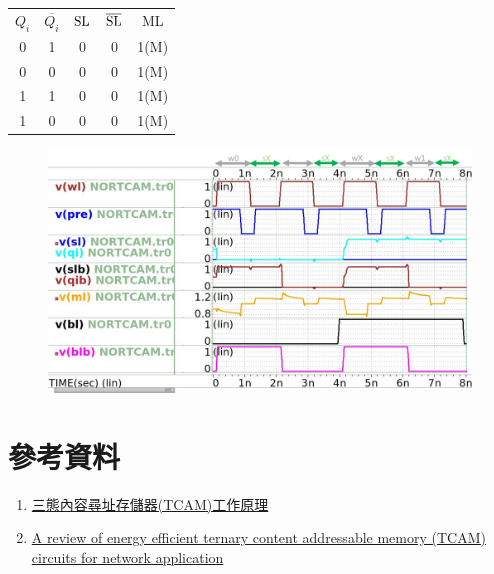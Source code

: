 \documentclass{article}
\begin{document}
\begin{table}[H]
  \centering
  \begin{tabular}{ccccc}
  $Q_i$ & $\overline{Q_i}$& $\rm SL$ & $\rm \overline{SL}$ & ML \\
  0  & 1     & 0  & 0     & 1(M) \\
  0  & 0     & 0  & 0     & 1(M) \\
  1  & 1     & 0  & 0     & 1(M) \\
  1  & 0     & 0  & 0     & 1(M) \\
 
  \end{tabular}
  \end{table}


\begin{figure}[H]
  \centering
  \includegraphics[width=\linewidth]{./img/2023-12-14-07-37-46.png}
  \end{figure}


  \section{參考資料}

  \begin{enumerate}
  
  \item\href{https://www.twblogs.net/a/5efe119e9644181341a1470a}{三態內容尋址存儲器(TCAM)工作原理}
  \item\href{http://103.82.172.44:8080/xmlui/bitstream/handle/123456789/28/A%20review%20of%20energy%20efficient%20ternary%20content%20.pdf?sequence=1&isAllowed=y&fbclid=IwAR1BU996txL15ISYrxkESIV1MQAB6pPLOH_FBdmN2Md4_hbKFK63faACwHc}{A review of energy efficient ternary content
  addressable memory (TCAM) circuits for network
  application}

\end{enumerate}
\end{document}
